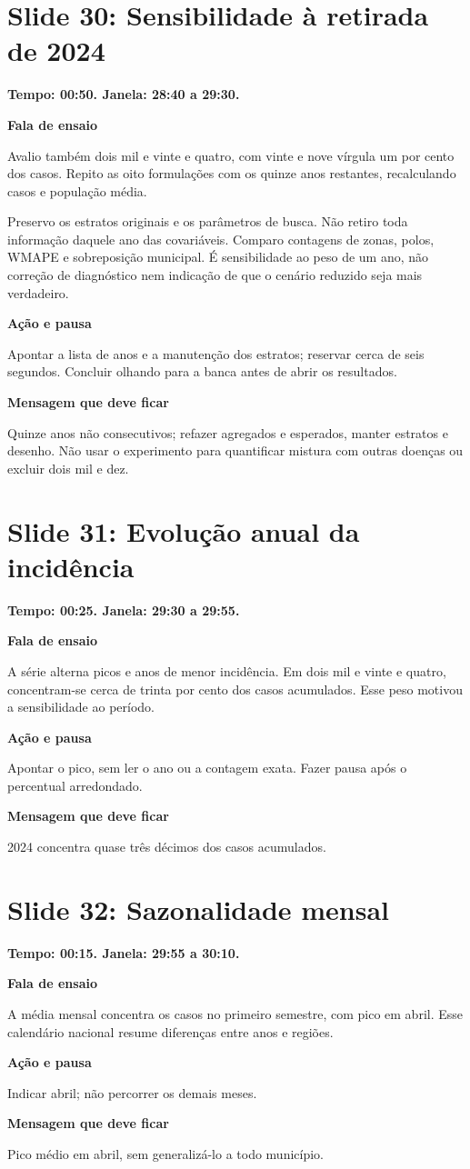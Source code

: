 \documentclass[11pt,a4paper]{article}
\newcommand{\bloco}[1]{\par\Needspace{3\baselineskip}\textbf{#1}\par}
\newcommand{\slide}[2]{\Needspace{13\baselineskip}\section*{Slide #1: #2}}
\begin{document}
\par\begin{minipage}{\textwidth}
\slide{30}{Sensibilidade à retirada de 2024}
{\color{azul}\textbf{Tempo: 00:50. Janela: 28:40 a 29:30.}}\par
\bloco{Fala de ensaio}
Avalio também dois mil e vinte e quatro, com vinte e nove vírgula um por cento dos casos. Repito as oito formulações com os quinze anos restantes, recalculando casos e população média.

Preservo os estratos originais e os parâmetros de busca. Não retiro toda informação daquele ano das covariáveis. Comparo contagens de zonas, polos, WMAPE e sobreposição municipal. É sensibilidade ao peso de um ano, não correção de diagnóstico nem indicação de que o cenário reduzido seja mais verdadeiro.
\bloco{Ação e pausa}
Apontar a lista de anos e a manutenção dos estratos; reservar cerca de seis segundos. Concluir olhando para a banca antes de abrir os resultados.
\bloco{Mensagem que deve ficar}
Quinze anos não consecutivos; refazer agregados e esperados, manter estratos e desenho. Não usar o experimento para quantificar mistura com outras doenças ou excluir dois mil e dez.
\end{minipage}\par\bigskip
\par\begin{minipage}{\textwidth}
\slide{31}{Evolução anual da incidência}
{\color{azul}\textbf{Tempo: 00:25. Janela: 29:30 a 29:55.}}\par
\bloco{Fala de ensaio}
A série alterna picos e anos de menor incidência. Em dois mil e vinte e quatro, concentram-se cerca de trinta por cento dos casos acumulados. Esse peso motivou a sensibilidade ao período.
\bloco{Ação e pausa}
Apontar o pico, sem ler o ano ou a contagem exata. Fazer pausa após o percentual arredondado.
\bloco{Mensagem que deve ficar}
2024 concentra quase três décimos dos casos acumulados.
\end{minipage}\par\bigskip
\par\begin{minipage}{\textwidth}
\slide{32}{Sazonalidade mensal}
{\color{azul}\textbf{Tempo: 00:15. Janela: 29:55 a 30:10.}}\par
\bloco{Fala de ensaio}
A média mensal concentra os casos no primeiro semestre, com pico em abril. Esse calendário nacional resume diferenças entre anos e regiões.
\bloco{Ação e pausa}
Indicar abril; não percorrer os demais meses.
\bloco{Mensagem que deve ficar}
Pico médio em abril, sem generalizá-lo a todo município.
\end{minipage}\par\bigskip
\end{document}
